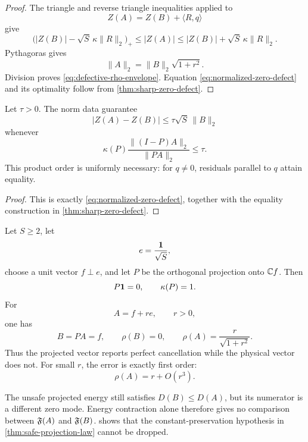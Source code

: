 \begin{proof}
The triangle and reverse triangle inequalities applied to
\[
 Z(A)=Z(B)+\langle R,q\rangle
\]
give
\[
 \bigl(|Z(B)|-\sqrt S\,\kappa\|R\|_2\bigr)_+
 \le |Z(A)|
 \le
 |Z(B)|+\sqrt S\,\kappa\|R\|_2.
\]
Pythagoras gives
\[
 \|A\|_2=\|B\|_2\sqrt{1+r^2}.
\]
Division proves \eqref{eq:defective-rho-envelope}.  Equation
\eqref{eq:normalized-zero-defect} and its optimality follow from
\cref{thm:sharp-zero-defect}.
\end{proof}

\begin{corollary}
\label{cor:product-criterion}
Let \(\tau>0\).  The norm data guarantee
\[
 |Z(A)-Z(B)|
 \le\tau\sqrt S\,\|B\|_2
\]
whenever
\begin{equation}
 \kappa(P)
 \frac{\|(I-P)A\|_2}{\|PA\|_2}
 \le\tau.
\label{eq:kappa-r-criterion}
\end{equation}
This product order is uniformly necessary: for \(q\ne0\), residuals
parallel to \(q\) attain equality.
\end{corollary}

\begin{proof}
This is exactly \eqref{eq:normalized-zero-defect}, together with
the equality construction in \cref{thm:sharp-zero-defect}.
\end{proof}

\begin{example}
\label{ex:unsafe-false-positive}
Let \(S\ge2\), let
\[
 e=\frac{\mathbf 1}{\sqrt S},
\]
choose a unit vector \(f\perp e\), and let \(P\) be the orthogonal
projection onto \(\mathbb C f\).  Then
\[
 P\mathbf 1=0,\qquad \kappa(P)=1.
\]
For
\[
 A=f+r e,\qquad r>0,
\]
one has
\[
 B=PA=f,\qquad
 \rho(B)=0,\qquad
 \rho(A)=\frac{r}{\sqrt{1+r^2}}.
\]
Thus the projected vector reports perfect cancellation while the
physical vector does not.  For small \(r\), the error is exactly
first order:
\[
 \rho(A)=r+O(r^3).
\]
\end{example}

\begin{remark}
\label{rem:no-monotonicity-unsafe}
The unsafe projected energy still satisfies \(D(B)\le D(A)\), but
its numerator is a different zero mode.  Energy contraction alone
therefore gives no comparison between \(\mathfrak F(A)\) and
\(\mathfrak F(B)\).   shows that the
constant-preservation hypothesis in
\cref{thm:safe-projection-law} cannot be dropped.
\end{remark}

